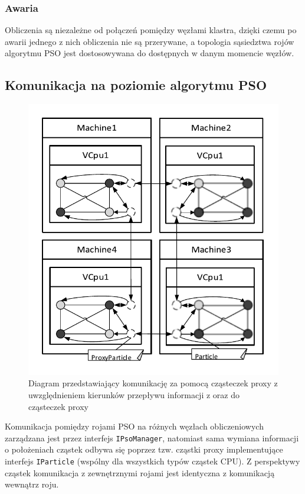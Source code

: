 \documentclass[12pt, twoside, openany, abstract=on]{report}
\theoremstyle{definition}
\begin{document}
\subsubsection{Awaria}
Obliczenia są niezależne od połączeń pomiędzy węzłami klastra, dzięki czemu po awarii jednego z nich obliczenia nie są przerywane, a topologia sąsiedztwa rojów algorytmu PSO jest dostosowywana do dostępnych w danym momencie węzłów.

\subsection{Komunikacja na poziomie algorytmu PSO}
\begin{figure}[H]
    \centering
 \includegraphics[scale=1]{ProxyCommunication.pdf}
 \caption{Diagram przedstawiający komunikację za pomocą cząsteczek proxy z uwzględnieniem kierunków przepływu informacji z oraz do cząsteczek proxy}
\end{figure}

Komunikacja pomiędzy rojami PSO na różnych węzłach obliczeniowych zarządzana jest przez interfejs \texttt{IPsoManager}, natomiast sama wymiana informacji o położeniach cząstek odbywa się poprzez tzw. cząstki proxy implementujące interfejs \texttt{IParticle} (wspólny dla wszystkich typów cząstek CPU). Z perspektywy cząstek komunikacja z zewnętrznymi rojami jest identyczna z komunikacją wewnątrz roju. 
\end{document}
